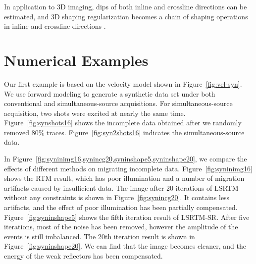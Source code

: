 
In application to 3D imaging,
dips of both inline and crossline directions can be estimated, 
and 3D shaping regularization becomes a chain of shaping operations in inline and crossline directions \cite[]{sergeyshape1}.

\section{Numerical Examples}
Our first example is based on the velocity model shown in Figure~\ref{fig:vel-syn}.
We use forward modeling to generate a synthetic data set under both conventional and simultaneous-source acquisitions.
For simultaneous-source acquisition, two shots were excited at nearly the same time. 
Figure~\ref{fig:synshots16} shows the incomplete data obtained after we randomly removed $80\%$ traces.
Figure~\ref{fig:syn2shots16} indicates the simultaneous-source data.


In Figure~\ref{fig:syninimg16,synincg20,syninshape5,syninshape20}, 
we compare the effects of different methods on migrating incomplete data.
Figure~\ref{fig:syninimg16} shows the RTM result, 
which has poor illumination and a number of migration artifacts caused by insufficient data.
The image after 20 iterations of LSRTM without any constraints is shown in Figure~\ref{fig:synincg20}.
It contains less artifacts, and the effect of poor illumination has been partially compensated.
Figure~\ref{fig:syninshape5} shows the fifth iteration result of LSRTM-SR.
After five iterations, most of the noise has been removed, however the amplitude of the events is still imbalanced.
The 20th iteration result is shown in Figure~\ref{fig:syninshape20}.
We can find that the image becomes cleaner, and the energy of the weak reflectors has been compensated.


